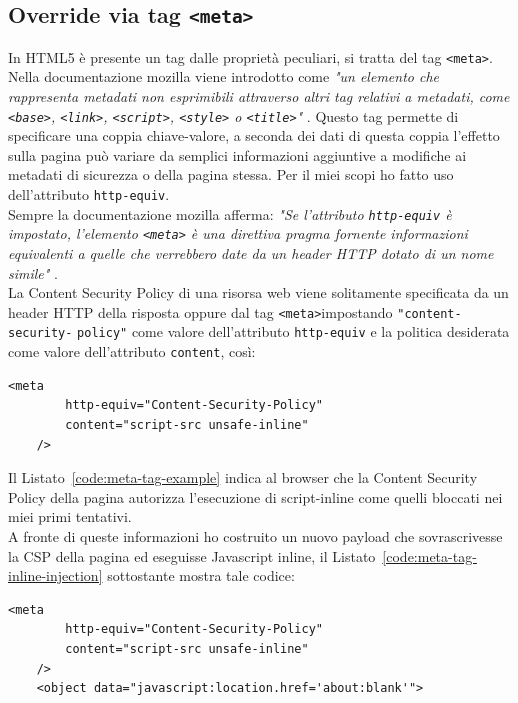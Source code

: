 \documentclass{sapthesis}
\newcommand{\code}[1]{\texttt{#1}}
\newcommand{\refCode}[1]{Listato~\ref{#1}}
\newcommand{\JS}{Javascript}
\newcommand{\tagHTML}[1]{\code{<#1>}}
\newcommand{\meta}{\tagHTML{meta}}
\newcommand{\script}{\tagHTML{script}}
\begin{document}
        \subsection{Override via tag \meta}
        \label{sec:attaccando-vuln-bypass-meta}
            In HTML5 è presente un tag dalle proprietà peculiari, si tratta del tag \meta.
            Nella documentazione mozilla viene introdotto come \textit{"un elemento che rappresenta 
            metadati non esprimibili attraverso altri tag relativi a metadati, come \code{<base>}, 
            \code{<link>}, \script, \code{<style>} o \code{<title>}"} \cite{tag-meta}.
            Questo tag permette di specificare una coppia chiave-valore, a seconda dei dati di
            questa coppia l'effetto sulla pagina può variare da semplici informazioni aggiuntive
            a modifiche ai metadati di sicurezza o della pagina stessa. Per il miei scopi ho fatto
            uso dell'attributo \code{http-equiv}.\\
            Sempre la documentazione mozilla afferma: \textit{"Se l'attributo \code{http-equiv} è impostato,
            l'elemento \meta{} è una direttiva pragma fornente informazioni equivalenti a quelle che
            verrebbero date da un header HTTP dotato di un nome simile"} \cite{tag-meta}.\\
            La Content Security Policy di una risorsa web viene solitamente specificata da un header HTTP della
            risposta oppure dal tag \meta impostando \code{"content-security-} \code{policy"} come valore
            dell'attributo \code{http-equiv} e la politica desiderata come valore dell'attributo \code{content},
            così:
            \begin{lstlisting}[label=code:meta-tag-example,caption={Esempio di CSP dichiarata nel documento della pagina}]
    <meta 
        http-equiv="Content-Security-Policy" 
        content="script-src unsafe-inline" 
    />
            \end{lstlisting}
            Il \refCode{code:meta-tag-example} indica al browser che la Content Security Policy della
            pagina autorizza l'esecuzione di script-inline come quelli bloccati nei miei primi tentativi.\\
            A fronte di queste informazioni ho costruito un nuovo payload che sovrascrivesse la CSP della
            pagina ed eseguisse \JS{} inline, il \refCode{code:meta-tag-inline-injection} sottostante mostra tale codice:
            \begin{lstlisting}[label=code:meta-tag-inline-injection, caption={Payload per sovrascrivere la CSP del documento ed eseguire javascript inline}]
    <meta 
        http-equiv="Content-Security-Policy" 
        content="script-src unsafe-inline" 
    />
    <object data="javascript:location.href='about:blank'">
            \end{lstlisting}
\end{document}
